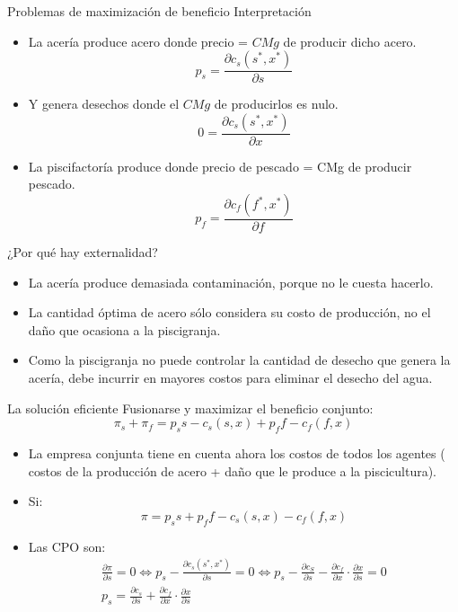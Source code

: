 \begin{frame}{Problemas de maximización de beneficio}
	Interpretación
		\begin{itemize}
			\item La acería produce acero donde precio = $CMg$ de producir dicho acero.
					$$p_s = \frac{\partial c_s(s^\ast,x^\ast)}{\partial s}$$
			\item Y genera desechos donde el $CMg$ de producirlos es nulo.
					$$0 = \frac{\partial c_s(s^\ast,x^\ast)}{\partial x}$$
			\item La piscifactoría produce donde precio de pescado = CMg de producir pescado.
					$$p_f = \frac{\partial c_f(f^\ast,x^\ast)}{\partial f}$$
		\end{itemize}
\end{frame}
\begin{frame}{¿Por qué hay externalidad?}
	\begin{itemize}
		\item La acería produce demasiada contaminación, porque no le cuesta hacerlo.
		\item La cantidad óptima de acero sólo considera su costo de producción, no el daño que ocasiona a la piscigranja. 
		\item Como la piscigranja no puede controlar la cantidad de desecho que genera la acería, debe incurrir en mayores costos para eliminar el desecho del agua.
	\end{itemize}
\end{frame}
\begin{frame}{La solución eficiente}
	Fusionarse y maximizar el beneficio conjunto:
			$$\pi_s + \pi_f = p_ss - c_s(s,x) + p_ff - c_f(f,x)$$
				\vspace{-0.4cm}
		\begin{itemize}
			\item La empresa conjunta tiene en cuenta ahora los costos de todos los agentes ( costos de la producción de acero +  daño que le produce a la piscicultura). 
			\item Si: 
					$$\pi = p_ss + p_ff - c_s(s,x) - c_f(f,x)$$
			\item Las CPO son:
					\begin{gather*}
						\frac{\partial \pi}{\partial s} = 0 \Leftrightarrow p_s - \frac{\partial c_s(s^\ast,x^\ast)}{\partial s} = 0 \Leftrightarrow p_s - \frac{\partial c_S}{\partial s} - \frac{\partial c_f}{\partial x} \cdot \frac{\partial x}{\partial s} = 0\\
						p_s =  \frac{\partial c_s}{\partial s} + \frac{\partial c_f}{\partial x} \cdot \frac{\partial x}{\partial s}
					\end{gather*}
		\end{itemize}
\end{frame}
